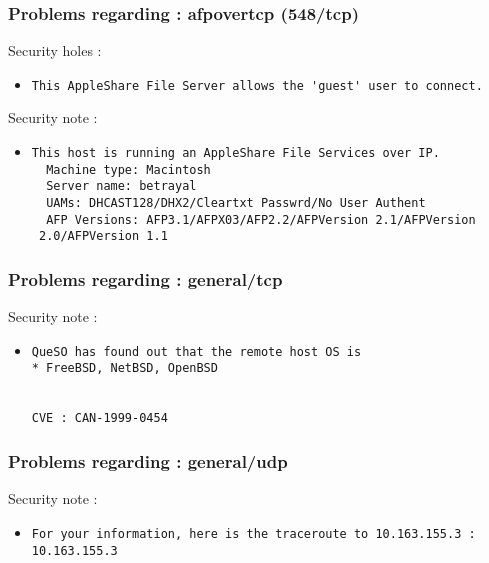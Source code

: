 \documentclass{article}
\begin{document}
\subsubsection{Problems regarding : afpovertcp (548/tcp)}
Security holes :\\
\begin{itemize}
\item \begin{verbatim}
This AppleShare File Server allows the 'guest' user to connect.

\end{verbatim}\end{itemize}
Security note :\\
\begin{itemize}
\item \begin{verbatim}
This host is running an AppleShare File Services over IP.
  Machine type: Macintosh
  Server name: betrayal
  UAMs: DHCAST128/DHX2/Cleartxt Passwrd/No User Authent
  AFP Versions: AFP3.1/AFPX03/AFP2.2/AFPVersion 2.1/AFPVersion
 2.0/AFPVersion 1.1

\end{verbatim}\end{itemize}
\subsubsection{Problems regarding : general/tcp}
Security note :\\
\begin{itemize}
\item \begin{verbatim}
QueSO has found out that the remote host OS is 
* FreeBSD, NetBSD, OpenBSD  


CVE : CAN-1999-0454
\end{verbatim}\end{itemize}
\subsubsection{Problems regarding : general/udp}
Security note :\\
\begin{itemize}
\item \begin{verbatim}
For your information, here is the traceroute to 10.163.155.3 : 
10.163.155.3

\end{verbatim}\end{itemize}
\end{document}
